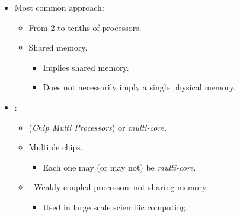 \begin{frame}[t]
\begin{itemize}
  \item Most common approach:
    \begin{itemize}
      \item From 2 to tenths of processors.
      \item Shared memory.
        \begin{itemize}
          \item Implies shared memory.
          \item Does not necessarily imply a single physical memory.
        \end{itemize}
    \end{itemize}

  \item {}:
    \begin{itemize}
      \item {} (\emph{Chip Multi Processors}) or \emph{multi-core}.
      \item Multiple chips.
        \begin{itemize}
          \item Each one may (or may not) be \emph{multi-core}.
        \end{itemize}
      \item {}: 
            Weakly coupled processors not sharing memory.
        \begin{itemize}
          \item Used in large scale scientific computing.
        \end{itemize}
    \end{itemize}
\end{itemize}
\end{frame}

